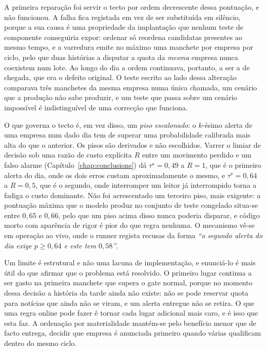 A primeira reparação foi servir o tecto por ordem decrescente dessa pontuação, e não funcionou. A
falha fica registada em vez de ser substituída em silêncio, porque a sua causa é uma propriedade da
implantação que nenhum teste de componente conseguiria expor: ordenar só reordena candidatas
presentes ao mesmo tempo, e a varredura emite no máximo uma manchete por empresa por ciclo, pelo que
duas histórias a disputar a quota da \emph{mesma} empresa nunca coexistem num lote. Ao longo do dia a
ordem continuava, portanto, a ser a de chegada, que era o defeito original. O teste escrito ao lado
dessa alteração comparava três manchetes da mesma empresa numa única chamada, um cenário que a
produção não sabe produzir, e um teste que passa sobre um cenário impossível é indistinguível de uma
correcção que funciona.

O que governa o tecto é, em vez disso, um \emph{piso escalonado}: o $k$-ésimo alerta de uma empresa
num dado dia tem de superar uma probabilidade calibrada mais alta do que o anterior. Os pisos são
derivados e não escolhidos. Varrer o limiar de decisão sob uma razão de custo explícita $R$ entre um
movimento perdido e um falso alarme (Capítulo~\ref{chap:conclusions}) dá $\tau^\star = 0,49$ a $R=1$,
que é o primeiro alerta do dia, onde os dois erros custam aproximadamente o mesmo, e
$\tau^\star = 0,64$ a $R = 0,5$, que é o segundo, onde interromper um leitor já interrompido torna a
fadiga o custo dominante. Não foi acrescentado um terceiro piso, mais exigente: a pontuação máxima
que o modelo produz no conjunto de teste congelado situa-se entre $0,65$ e $0,66$, pelo que um piso
acima disso nunca poderia disparar, e código morto com aparência de rigor é pior do que regra nenhuma.
O mecanismo vê-se em operação ao vivo, onde o runner regista recusas da forma \emph{``o segundo alerta
do dia exige $p \ge 0,64$ e este tem $0,58$''}.

Um limite é estrutural e não uma lacuna de implementação, e enunciá-lo é mais útil do que afirmar que
o problema está resolvido. O primeiro lugar continua a ser gasto na primeira manchete que supera o
gate normal, porque no momento dessa decisão a história da tarde ainda não existe: não se pode
reservar quota para notícias que ainda não se viram, e um alerta entregue não se retira. O que uma
regra online pode fazer é tornar cada lugar adicional mais caro, e é isso que esta faz. A ordenação
por materialidade mantém-se pelo benefício menor que de facto entrega, decidir que empresa é
anunciada primeiro quando várias qualificam dentro do mesmo ciclo.

